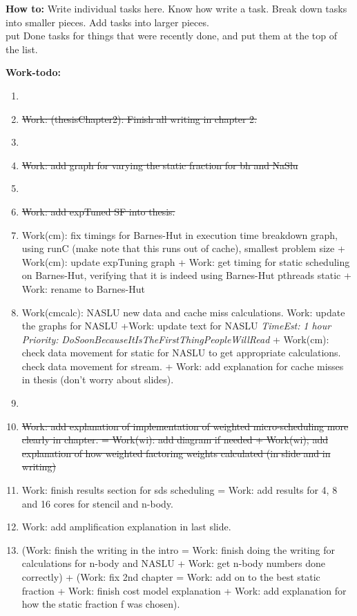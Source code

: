 \documentclass[11pt]{article}
\newcommand{\doneTask}[1]{\item \sout{#1}}
\newcommand{\te}[1]{\textit{TimeEst:} \textit{#1}}
\newcommand{\pr}[1]{\textit{Priority:} \textit{#1}}
\begin{document}
\newpage 
\textbf{How to:} Write individual tasks here. Know how write a task. 
Break down tasks into smaller pieces. Add tasks into larger
pieces. \\ put Done tasks for things that were recently done, and put
them at the top of the list. 

\textbf{Work-todo:}\\
\begin{enumerate} 

\item \doneTask{ Work: (thesisChapter2): Finish all writing in chapter
  2.} 
\item \doneTask{Work: add graph for varying the static fraction for bh
and NaSlu}

\item \doneTask{Work: add expTuned SF into thesis.}
 
\item Work(cm): fix timings for Barnes-Hut in execution time breakdown
  graph, using runC (make note that this runs out of cache), smallest
  problem size + Work(cm): update expTuning graph + Work: get timing
  for static scheduling on Barnes-Hut, verifying that it is indeed
  using Barnes-Hut pthreads static + Work: rename to Barnes-Hut 

\item Work(cmcalc): NASLU new data and cache miss calculations. 
  Work: update the graphs for NASLU  +Work: update text for NASLU
  \te{1 hour} \pr{DoSoonBecauseItIsTheFirstThingPeopleWillRead}  +
  Work(cm): check data movement for static for NASLU to get 
  appropriate calculations.  check data movement for stream. +  Work:
  add explanation for cache misses in thesis (don't worry about
  slides). 

\item \doneTask{Work: add explanation of implementation of weighted
  micro-scheduling more clearly in chapter. = Work(wi): add diagram
  if needed + Work(wi); add explanation of how weighted factoring
  weights calculated (in slide and in writing)}

\item Work: finish results section for sds scheduling = Work: add
  results for 4, 8 and 16 cores for stencil and n-body. 

\item Work: add amplification explanation in last slide. 

\item (Work: finish the writing in the intro  =  Work: finish doing
 the writing for calculations for n-body and NASLU  + Work: get n-body
 numbers done correctly) + (Work: fix 2nd chapter  = Work: add on to the 
best static fraction  +  Work: finish cost model explanation + Work: add explanation for how
   the static fraction f was chosen).  


\end{enumerate}
\end{document}
